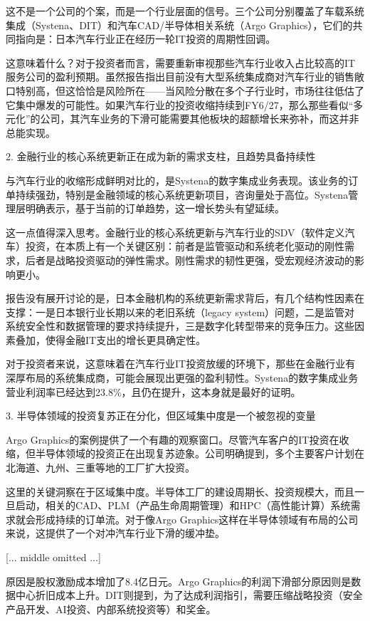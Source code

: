 \documentclass[11pt]{ctexart}
\begin{document}
这不是一个公司的个案，而是一个行业层面的信号。三个公司分别覆盖了车载系统集成（Systena、DIT）和汽车CAD/半导体相关系统（Argo Graphics），它们的共同指向是：日本汽车行业正在经历一轮IT投资的周期性回调。

这意味着什么？对于投资者而言，需要重新审视那些汽车行业收入占比较高的IT服务公司的盈利预期。虽然报告指出目前没有大型系统集成商对汽车行业的销售敞口特别高，但这恰恰是风险所在——当风险分散在多个子行业时，市场往往低估了它集中爆发的可能性。如果汽车行业的投资收缩持续到FY6/27，那么那些看似“多元化”的公司，其汽车业务的下滑可能需要其他板块的超额增长来弥补，而这并非总能实现。

2. 金融行业的核心系统更新正在成为新的需求支柱，且趋势具备持续性

与汽车行业的收缩形成鲜明对比的，是Systena的数字集成业务表现。该业务的订单持续强劲，特别是金融领域的核心系统更新项目，咨询量处于高位。Systena管理层明确表示，基于当前的订单趋势，这一增长势头有望延续。

这一点值得深入思考。金融行业的核心系统更新与汽车行业的SDV（软件定义汽车）投资，在本质上有一个关键区别：前者是监管驱动和系统老化驱动的刚性需求，后者是战略投资驱动的弹性需求。刚性需求的韧性更强，受宏观经济波动的影响更小。

报告没有展开讨论的是，日本金融机构的系统更新需求背后，有几个结构性因素在支撑：一是日本银行业长期以来的老旧系统（legacy system）问题，二是监管对系统安全性和数据管理的要求持续提升，三是数字化转型带来的竞争压力。这些因素叠加，使得金融IT支出的增长更具确定性。

对于投资者来说，这意味着在汽车行业IT投资放缓的环境下，那些在金融行业有深厚布局的系统集成商，可能会展现出更强的盈利韧性。Systena的数字集成业务营业利润率已经达到23.8\%，且仍在提升，这本身就是最好的证明。

3. 半导体领域的投资复苏正在分化，但区域集中度是一个被忽视的变量

Argo Graphics的案例提供了一个有趣的观察窗口。尽管汽车客户的IT投资在收缩，但半导体领域的投资正在出现复苏迹象。公司明确提到，多个主要客户计划在北海道、九州、三重等地的工厂扩大投资。

这里的关键洞察在于区域集中度。半导体工厂的建设周期长、投资规模大，而且一旦启动，相关的CAD、PLM（产品生命周期管理）和HPC（高性能计算）系统需求就会形成持续的订单流。对于像Argo Graphics这样在半导体领域有布局的公司来说，这提供了一个对冲汽车行业下滑的缓冲垫。

[... middle omitted ...]

原因是股权激励成本增加了8.4亿日元。Argo Graphics的利润下滑部分原因则是数据中心折旧成本上升。DIT则提到，为了达成利润指引，需要压缩战略投资（安全产品开发、AI投资、内部系统投资等）和奖金。
\end{document}
